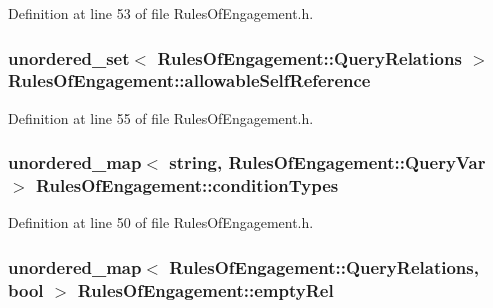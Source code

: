 Definition at line 53 of file Rules\-Of\-Engagement.\-h.

\hypertarget{class_rules_of_engagement_a8c7c45f1c886563e1a9e62cd0c22866d}{
\subsubsection[{allowable\-Self\-Reference}]{\setlength{\rightskip}{0pt plus 5cm}unordered\-\_\-set$<$ {\bf Rules\-Of\-Engagement\-::\-Query\-Relations} $>$ Rules\-Of\-Engagement\-::allowable\-Self\-Reference\hspace{0.3cm}{\ttfamily [static]}}}\label{class_rules_of_engagement_a8c7c45f1c886563e1a9e62cd0c22866d}


Definition at line 55 of file Rules\-Of\-Engagement.\-h.

\hypertarget{class_rules_of_engagement_a5f44ebe9fe8019b6415272f410673755}{
\subsubsection[{condition\-Types}]{\setlength{\rightskip}{0pt plus 5cm}unordered\-\_\-map$<$ string, {\bf Rules\-Of\-Engagement\-::\-Query\-Var} $>$ Rules\-Of\-Engagement\-::condition\-Types\hspace{0.3cm}{\ttfamily [static]}}}\label{class_rules_of_engagement_a5f44ebe9fe8019b6415272f410673755}


Definition at line 50 of file Rules\-Of\-Engagement.\-h.

\hypertarget{class_rules_of_engagement_a343933b8d961a5dfab7a3cdd979820cf}{
\subsubsection[{empty\-Rel}]{\setlength{\rightskip}{0pt plus 5cm}unordered\-\_\-map$<$ {\bf Rules\-Of\-Engagement\-::\-Query\-Relations}, bool $>$ Rules\-Of\-Engagement\-::empty\-Rel\hspace{0.3cm}{\ttfamily [static]}}}\label{class_rules_of_engagement_a343933b8d961a5dfab7a3cdd979820cf}


